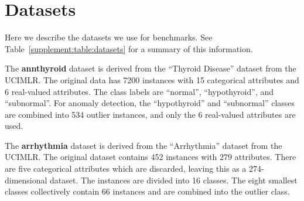 










\renewcommand{\thetable}{S\arabic{table}}

\renewcommand{\thefigure}{S\arabic{figure}}

\section{Datasets}
\label{supplement:sec:datasets}

Here we describe the datasets we use for benchmarks.
See Table~\ref{supplement:table:datasets} for a summary of this information.

The \textbf{annthyroid} dataset is derived from the ``Thyroid Disease'' dataset from the UCIMLR\@.
The original data has 7200 instances with 15 categorical attributes and 6 real-valued attributes.
The class labels are ``normal'', ``hypothyroid'', and ``subnormal''.
For anomaly detection, the ``hypothyroid'' and ``subnormal'' classes are combined into 534 outlier instances, and only the 6 real-valued attributes are used.

The \textbf{arrhythmia} dataset is derived from the ``Arrhythmia'' dataset from the UCIMLR\@.
The original dataset contains 452 instances with 279 attributes.
There are five categorical attributes which are discarded, leaving this as a 274-dimensional dataset.
The instances are divided into 16 classes.
The eight smallest classes collectively contain 66 instances and are combined into the outlier class.

